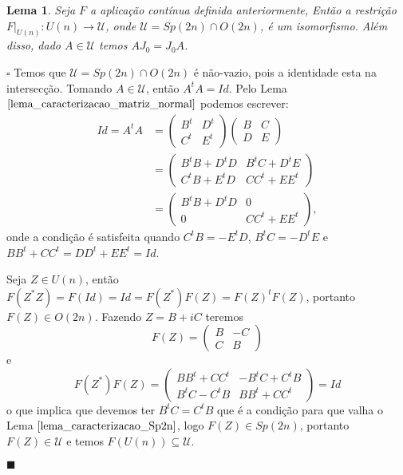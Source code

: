 \documentclass[12pt]{book}
\newtheorem{lema}[teorema]{Lema}
\newenvironment{prova}[1]{$\square$ #1}{\hfill$\blacksquare$}
\newcommand{\gruposimpletico}[1]{Sp(#1)}
\newcommand{\matrizortogonal}[1]{O(#1)}
\newcommand{\matrizunitaria}[1]{U(#1)}
\begin{document}
	\begin{lema}\label{lema_isomorfismo_U}
		Seja $F$ a aplicação contínua definida anteriormente, Então a restrição $F|_{\matrizunitaria{n}}: \matrizunitaria{n} \to \mathcal{U}$, onde $\mathcal{U} = \gruposimpletico{2n}\cap \matrizortogonal{2n}$, é um isomorfismo. Além disso, dado $A \in \mathcal{U}$ temos $AJ_{0}=J_{0}A$.
	\end{lema}
	\begin{prova}
		Temos que $\mathcal{U} = \gruposimpletico{2n} \cap \matrizortogonal{2n}$ é não-vazio, pois a identidade esta na intersecção. Tomando $A \in \mathcal{U}$, então $A^{t}A= Id$. Pelo Lema $\ref{lema_caracterizacao_matriz_normal}$ podemos escrever:
		$$
			\begin{aligned}
				Id=A^{t}A &=
				\left(
				\begin{array}{cc}
				B^{t} & D^{t}
				\\
				C^{t} & E^{t}
				\end{array}
				\right)
				\left(
				\begin{array}{cc}
				B & C
				\\
				D & E
				\end{array}
				\right)
			\\
			&= 
			\left(
			\begin{array}{cc}
			B^{t}B + D^{t}D & B^{t}C + D^{t}E 
			\\
			C^{t}B + E^{t}D  & CC^{t}+EE^{t}
			\end{array}
			\right)
			\\
			&=
			\left(
			\begin{array}{cc}
			B^{t}B + D^{t}D & 0 
			\\
			0 & CC^{t}+EE^{t}
			\end{array}
			\right),
			\end{aligned}
		$$
		onde a condição é satisfeita quando $C^{t}B =- E^{t}D$, $B^{t}C =- D^{t}E$ e $BB^{t} + CC^{t} = DD^{t}+EE^{t} = Id$. 
		
		Seja $Z \in \matrizunitaria{n}$, então $F(Z^{*}Z) = F(Id) = Id = F(Z^{*})F(Z) = F(Z)^{t}F(Z)$, portanto $F(Z) \in \matrizortogonal{2n}$. Fazendo $Z= B+iC$ teremos
		$$
		F(Z)=
		\left(
		\begin{array}{cc}
		B & -C
		\\
		C & B
		\end{array}
		\right)
		$$
		e
		$$
		F(Z^{*})F(Z)=
		\left(
		\begin{array}{cc}
		BB^{t} +CC^{t} & -B^{t}C +C^{t}B
		\\
		B^{t}C -C^{t}B & BB^{t} +CC^{t}
		\end{array}
		\right)	
		= Id
		$$
		o que implica que devemos ter $B^{t}C =C^{t}B$ que é a condição para que valha o Lema $\ref{lema_caracterizacao_Sp2n}$, logo $F(Z) \in \gruposimpletico{2n}$, portanto $F(Z) \in \mathcal{U}$ e temos $F(\matrizunitaria{n}) \subseteq \mathcal{U}$.
		

\end{prova}
\end{document}
